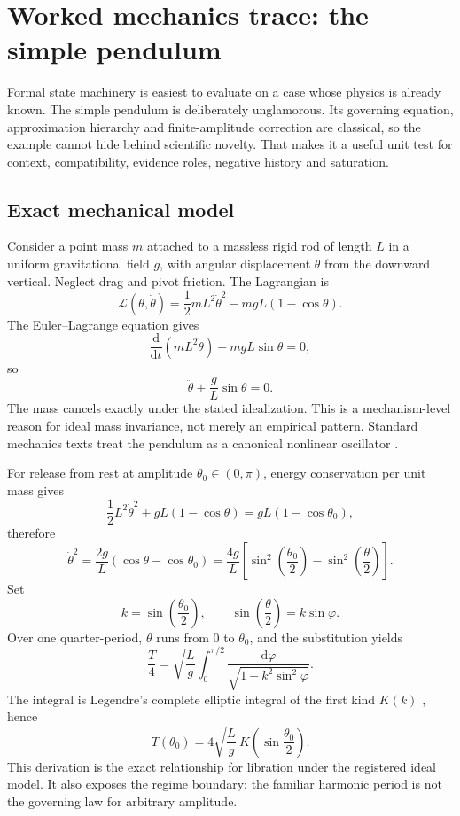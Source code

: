 \section{Worked mechanics trace: the simple pendulum}

Formal state machinery is easiest to evaluate on a case whose physics is already known. The simple pendulum is deliberately unglamorous. Its governing equation, approximation hierarchy and finite-amplitude correction are classical, so the example cannot hide behind scientific novelty. That makes it a useful unit test for context, compatibility, evidence roles, negative history and saturation.

\subsection{Exact mechanical model}

Consider a point mass \(m\) attached to a massless rigid rod of length \(L\) in a uniform gravitational field \(g\), with angular displacement \(\theta\) from the downward vertical. Neglect drag and pivot friction. The Lagrangian is
\[
\mathcal L(\theta,\dot\theta)
=\frac12 mL^2\dot\theta^2-mgL(1-\cos\theta).
\]
The Euler--Lagrange equation gives
\[
\frac{\mathrm d}{\mathrm dt}\left(mL^2\dot\theta\right)
+mgL\sin\theta=0,
\]
so
\[
\boxed{\ddot\theta+\frac{g}{L}\sin\theta=0.}
\]
The mass cancels exactly under the stated idealization. This is a mechanism-level reason for ideal mass invariance, not merely an empirical pattern. Standard mechanics texts treat the pendulum as a canonical nonlinear oscillator \cite{landau1976,strogatz2015}.

For release from rest at amplitude \(\theta_0\in(0,\pi)\), energy conservation per unit mass gives
\[
\frac12L^2\dot\theta^2+gL(1-\cos\theta)
=gL(1-\cos\theta_0),
\]
therefore
\[
\dot\theta^2
=\frac{2g}{L}(\cos\theta-\cos\theta_0)
=\frac{4g}{L}\left[\sin^2\!\left(\frac{\theta_0}{2}\right)
-\sin^2\!\left(\frac{\theta}{2}\right)\right].
\]
Set
\[
k=\sin\left(\frac{\theta_0}{2}\right),
\qquad
\sin\left(\frac\theta2\right)=k\sin\varphi.
\]
Over one quarter-period, \(\theta\) runs from \(0\) to \(\theta_0\), and the substitution yields
\[
\frac{T}{4}
=\sqrt{\frac{L}{g}}
\int_0^{\pi/2}
\frac{\mathrm d\varphi}{\sqrt{1-k^2\sin^2\varphi}}.
\]
The integral is Legendre's complete elliptic integral of the first kind \(K(k)\) \cite{dlmf2026}, hence
\[
\boxed{T(\theta_0)=4\sqrt{\frac{L}{g}}\,K\!\left(\sin\frac{\theta_0}{2}\right).}
\]
This derivation is the exact relationship for libration under the registered ideal model. It also exposes the regime boundary: the familiar harmonic period is not the governing law for arbitrary amplitude.

